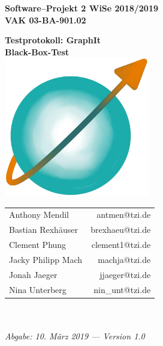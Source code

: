 \documentclass[enabledeprecatedfontcommands]{scrartcl}
\begin{document}
\thispagestyle{fancy}
\fancyhead[LO,RE]{ }
\fancyfoot[C]{}
\vspace{3cm}

\begin{minipage}[H]{\textwidth}
	\begin{center}
		\bf
		\Large
		Software--Projekt 2 WiSe 2018/2019\\
		\smallskip
		\small
		VAK 03-BA-901.02\\
		\vspace{3cm}
	\end{center}
\end{minipage}
\begin{minipage}[H]{\textwidth}
	\begin{center}
		\vspace{1cm}
		\bf
		\Large Testprotokoll: GraphIt\\
		Black-Box-Test\\
		\vspace{1cm}
		\includegraphics[width=2.5in]{logo_graphit.png}
		
		
	\end{center}
	
\end{minipage}
\vfill
\begin{minipage}[H]{\textwidth}
	\begin{center}
		\sf
		\begin{tabular}{lr}
			Anthony Mendil & antmen@tzi.de \\
			Bastian Rexhäuser & brexhaeu@tzi.de\\
			Clement Phung & clement1@tzi.de \\
			Jacky Philipp Mach & machja@tzi.de \\
			Jonah Jaeger & jjaeger@tzi.de \\
			Nina Unterberg & nin\_unt@tzi.de \\
		\end{tabular}
		\\ ~
		\vspace{2cm}
		\\
		\it Abgabe: 10. März 2019 --- Version 1.0\\ ~
	\end{center}
\end{minipage}
\end{document}
